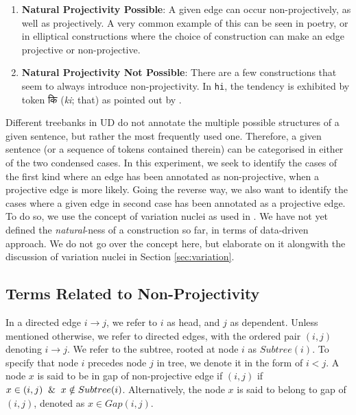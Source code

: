 \begin{enumerate}
    \item \textbf{Natural Projectivity Possible}: A given edge can occur non-projectively, as well as projectively. A very common example of this can be seen in poetry, or in elliptical constructions where the choice of construction can make an edge projective or non-projective.
    \item \textbf{Natural Projectivity Not Possible}: There are a few constructions that seem to always introduce non-projectivity. In \verb|hi|, the tendency is exhibited by token \texthindi{कि} (\textit{ki}; that) as pointed out by \cite{mannem2009insights}.
    
\end{enumerate}

Different treebanks in UD do not annotate the multiple possible structures of a given sentence, but rather the most frequently used one. Therefore, a given sentence (or a sequence of tokens contained therein) can be categorised in either of the two condensed cases. In this experiment, we seek to identify the cases of the first kind where an edge has been annotated as non-projective, when a projective edge is more likely. Going the reverse way, we also want to identify the cases where a given edge in second case has been annotated as a projective edge. To do so, we use the concept of variation nuclei as used in \cite{boyd}. We have not yet defined the \textit{natural}-ness of a construction so far, in terms of data-driven approach. We do not go over the concept here, but elaborate on it alongwith the discussion of variation nuclei in Section \ref{sec:variation}.

\subsection{Terms Related to Non-Projectivity}

In a directed edge \(i \rightarrow j\), we refer to \(i\) as head, and \(j\) as dependent. Unless mentioned otherwise, we refer to directed edges, with the ordered pair \((i, j)\) denoting \(i \rightarrow j\). We refer to the subtree, rooted at node \(i\) as \(Subtree(i)\). To specify that node \(i\) precedes node \(j\) in tree, we denote it in the form of \(i < j\). A node \(x\) is said to be in gap of non-projective edge if \((i,j)\) if \(x \in (i, j) \And x \notin Subtree(i)\). Alternatively, the node \(x\) is said to belong to gap of \((i, j)\), denoted as \(x \in Gap(i, j)\).

